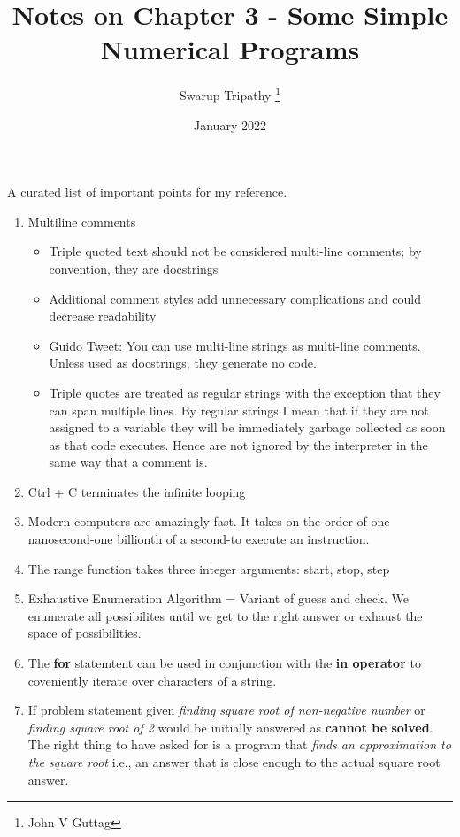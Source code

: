 \documentclass[11pt]{article}
\title{Notes on Chapter 3 - Some Simple Numerical Programs}
\author{Swarup Tripathy \thanks{John V Guttag}}
\date{January 2022}
\begin{document}
    \maketitle
    A curated list of important points for my reference.
    \begin{enumerate}
        \item Multiline comments
            \begin{itemize}
                \item Triple quoted text should not be considered multi-line comments; by convention, they are docstrings
                \item Additional comment styles add unnecessary complications and could decrease readability
                \item Guido Tweet: You can use multi-line strings as multi-line comments. Unless used as docstrings, they generate no code.
                \item Triple quotes are treated as regular strings with the exception that they can span multiple lines. 
                By regular strings I mean that if they are not assigned to a variable they will be immediately garbage collected as soon as that code executes. 
                Hence are not ignored by the interpreter in the same way that a comment is.
            \end{itemize}
        \item Ctrl + C terminates the infinite looping 
        \item Modern computers are amazingly fast. It takes on the order of one nanosecond-one billionth of a second-to execute an instruction.
        \item The range function takes three integer arguments: start, stop, step
        \item Exhaustive Enumeration Algorithm = Variant of guess and check. We enumerate all possibilites until we get to the right answer or exhaust the space of possibilities.
        \item The \textbf{for} statemtent can be used in conjunction with the \textbf{in operator} to coveniently iterate over characters of a string.
        \item If problem statement given \textit{finding square root of non-negative number} or \textit{finding square root of 2} would be initially answered as \textbf{cannot be solved}. 
        The right thing to have asked for is a program that \textit{finds an approximation to the square root} i.e., an answer that is close enough to the actual square root answer.

\end{enumerate}
\end{document}
